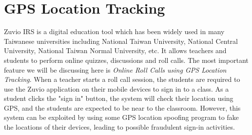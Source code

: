 \section{GPS Location Tracking}
Zuvio IRS is a digital education tool which has been widely used in many Taiwanese universities
including National Taiwan University, National Central University, National Taiwan Normal University, etc.
It allows teachers and students to perform online quizzes, discussions and roll calls. The most
important feature we will be discussing here is \emph{Online Roll Calls using GPS Location Tracking}.
When a teacher starts a roll call session, the students are required to use the Zuvio application
on their mobile devices to sign in to a class. As a student clicks the "sign in" button, the system will
check their location using GPS, and the students are expected to be near to the classroom. However, this
system can be exploited by using some GPS location spoofing program to fake the locations of their devices,
leading to possible fraudulent sign-in activities.
